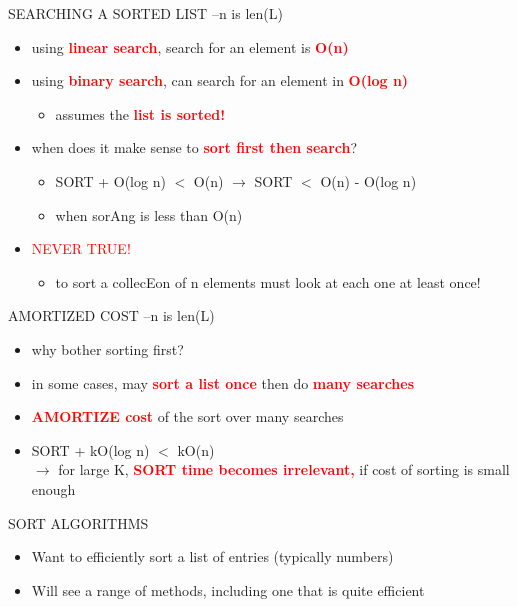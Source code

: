 \documentclass[aspectratio=169]{beamer}
\begin{document}
\begin{frame}{SEARCHING A SORTED LIST --n is len(L)}
\begin{itemize}
\item using \textcolor{red}{\textbf{linear search}}, search for an element is \textcolor{red}{\textbf{O(n)}}
\item using \textcolor{red}{\textbf{binary search}}, can search for an element in \textcolor{red}{\textbf{O(log n)}}
\begin{itemize}
\item assumes the \textcolor{red}{\textbf{list is sorted!}}
\end{itemize}

\item when does it make sense to \textcolor{red}{\textbf{sort first then search}}?
\begin{itemize}
\item  SORT + O(log n) $<$ O(n) $\rightarrow$ SORT $<$ O(n) - O(log n)
\item when sorAng is less than O(n)
\end{itemize}
\item \textcolor{red}{NEVER TRUE!}
\begin{itemize}
\item to sort a collecEon of n elements must look at each one at
least once!
\end{itemize}
\end{itemize}
\end{frame}

\begin{frame}{AMORTIZED COST --n is len(L)}
\begin{itemize}
\item why bother sorting first?
\item in some cases, may \textcolor{red}{\textbf{sort a list once}} then do \textcolor{red}{\textbf{many searches}}
\item \textcolor{red}{\textbf{AMORTIZE cost}} of the sort over many searches
\item SORT + k\*O(log n) $<$ k\*O(n) \\
	$\rightarrow$ for large K, \textcolor{red}{\textbf{SORT time becomes irrelevant,}} if cost of sorting is small enough
\end{itemize}
\end{frame}

\begin{frame}{SORT ALGORITHMS}
\begin{itemize}
\item  Want to efficiently sort a list of entries (typically
numbers)
\item Will see a range of methods, including one that is
quite efficient
\end{itemize}
\end{frame}
\end{document}
